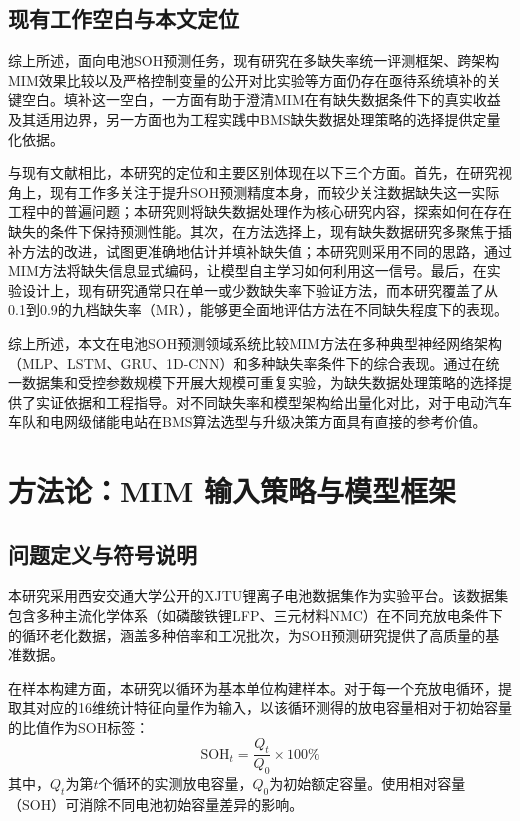 \documentclass[10pt,a4paper]{ctexart}
\begin{document}
\subsection{现有工作空白与本文定位}

综上所述，面向电池SOH预测任务，现有研究在多缺失率统一评测框架、跨架构MIM效果比较以及严格控制变量的公开对比实验等方面仍存在亟待系统填补的关键空白。填补这一空白，一方面有助于澄清MIM在有缺失数据条件下的真实收益及其适用边界，另一方面也为工程实践中BMS缺失数据处理策略的选择提供定量化依据。

与现有文献相比，本研究的定位和主要区别体现在以下三个方面。首先，在研究视角上，现有工作多关注于提升SOH预测精度本身，而较少关注数据缺失这一实际工程中的普遍问题；本研究则将缺失数据处理作为核心研究内容，探索如何在存在缺失的条件下保持预测性能。其次，在方法选择上，现有缺失数据研究多聚焦于插补方法的改进，试图更准确地估计并填补缺失值；本研究则采用不同的思路，通过MIM方法将缺失信息显式编码，让模型自主学习如何利用这一信号。最后，在实验设计上，现有研究通常只在单一或少数缺失率下验证方法，而本研究覆盖了从0.1到0.9的九档缺失率（MR），能够更全面地评估方法在不同缺失程度下的表现。

综上所述，本文在电池SOH预测领域系统比较MIM方法在多种典型神经网络架构（MLP、LSTM、GRU、1D-CNN）和多种缺失率条件下的综合表现。通过在统一数据集和受控参数规模下开展大规模可重复实验，为缺失数据处理策略的选择提供了实证依据和工程指导。对不同缺失率和模型架构给出量化对比，对于电动汽车车队和电网级储能电站在BMS算法选型与升级决策方面具有直接的参考价值。

\section{方法论：MIM 输入策略与模型框架}\label{sec:method}

\subsection{问题定义与符号说明}

本研究采用西安交通大学公开的XJTU锂离子电池数据集作为实验平台\cite{wang2024open,duan2025lithium}。该数据集包含多种主流化学体系（如磷酸铁锂LFP、三元材料NMC）在不同充放电条件下的循环老化数据，涵盖多种倍率和工况批次，为SOH预测研究提供了高质量的基准数据\cite{wang2024open,wang2024pinn}。

在样本构建方面，本研究以循环为基本单位构建样本。对于每一个充放电循环，提取其对应的16维统计特征向量作为输入，以该循环测得的放电容量相对于初始容量的比值作为SOH标签：
\begin{equation}
    \text{SOH}_t = \frac{Q_t}{Q_0} \times 100\%
    \label{eq:soh}
\end{equation}
其中，$Q_t$为第$t$个循环的实测放电容量，$Q_0$为初始额定容量。使用相对容量（SOH）可消除不同电池初始容量差异的影响。
\end{document}
